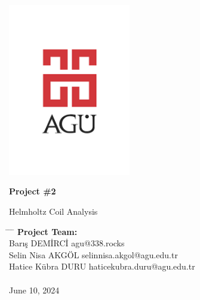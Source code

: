 \begin{center}
	\includegraphics[width=0.4\textwidth]{assets/agu.png}

	\Huge
	\textbf{Project \#2}

	\vspace{0.3cm}
	\Huge
	Helmholtz Coil Analysis

	\vspace{0.8cm}
	\large
	\vspace{0.5cm}
	\LARGE
	\vspace{1.5cm}
	\textbf{}
	\vfill
	\vspace{0.8cm}
	\Large
\end{center}

\begin{tabbing}
	\hspace*{1em} \= \hspace*{10em} \= \hspace*{11em} \= \kill
	\> \textbf{Project Team:} \> \>  \\
	\> Barış DEMİRCİ \> agu@338.rocks \> \\
	\> Selin Nisa AKGÖL \> selinnisa.akgol@agu.edu.tr \> \\
	\> Hatice Kübra DURU \> haticekubra.duru@agu.edu.tr \> \\
	\> \> \> \\
	\>  June 10, 2024 \> \> \\
\end{tabbing}
